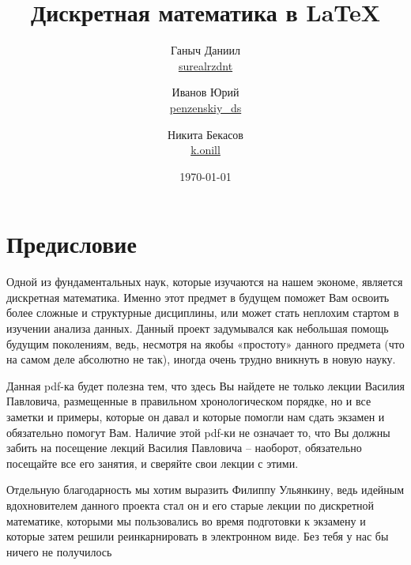 \documentclass[12pt, a4paper, oneside]{article}
\author{Ганыч Даниил \\ \href{https://vk.com/surealrzdnt}{surealrzdnt} \and Иванов Юрий \\ \href{https://vk.com/penzenskiy_ds}{penzenskiy\_ds} \and Никита Бекасов \\  \href{https://vk.com/k.onill}{k.onill}}
\title{Дискретная математика в \LaTeX}
\date{\today}
\theoremstyle{plain} %
\theoremstyle{definition}
\newtheorem*{definition}{Определение}  %
\newcommand{\indef}[1]{\textbf{ \color{dark_red} #1}}
\begin{document}

\maketitle





\section*{Предисловие}

Одной из фундаментальных наук, которые изучаются на нашем экономе, является дискретная математика. Именно этот предмет в будущем поможет Вам освоить более сложные и структурные дисциплины, или может стать неплохим стартом в изучении анализа данных. Данный проект задумывался как небольшая помощь будущим поколениям, ведь, несмотря на якобы «простоту» данного предмета (что на самом деле абсолютно не так), иногда очень трудно вникнуть в новую науку. 

Данная pdf-ка будет полезна тем, что здесь Вы найдете не только лекции Василия Павловича, размещенные в правильном хронологическом порядке, но и все заметки и примеры, которые он давал и которые помогли нам сдать экзамен и обязательно помогут Вам. Наличие этой pdf-ки не означает то, что Вы должны забить на посещение лекций Василия Павловича – наоборот, обязательно посещайте все его занятия, и сверяйте свои лекции с этими.


Отдельную благодарность мы хотим выразить Филиппу Ульянкину, ведь идейным вдохновителем данного проекта стал он и его старые лекции по дискретной математике, которыми мы пользовались во время подготовки к экзамену и которые затем решили реинкарнировать в электронном виде. Без тебя у нас бы ничего не получилось \Heart  
\end{document}
